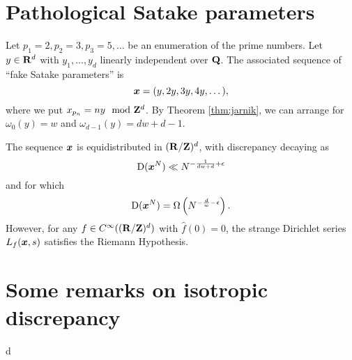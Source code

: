 \section{Pathological Satake parameters}

Let $p_1 = 2, p_2 = 3, p_3 = 5, \dots$ be an enumeration of the prime numbers. 
Let $y\in \mathbf{R}^d$ with $y_1,\dots,y_d$ linearly independent over $\mathbf{Q}$. The 
associated sequence of ``fake Satake parameters'' is 
\[
	{\boldsymbol x} = (y, 2y, 3 y, 4 y, \dots) ,
\]
where we put $x_{p_n} = n y\mod {\mathbf{Z}}^d$. By Theorem \ref{thm:jarnik}, we can 
arrange for $\omega_0(y) = w$ and $\omega_{d-1}(y) = d w + d - 1$. 

\begin{theorem}
The sequence ${\boldsymbol x}$ is equidistributed in $(\mathbf{R}/\mathbf{Z})^d$, with discrepancy 
decaying as 
\[
	\operatorname{D}({\boldsymbol x}^N) \ll N^{-\frac{1}{d w+d} + \epsilon} 
\]
and for which 
\[
	\operatorname{D}({\boldsymbol x}^N) = \Omega\left(N^{-\frac{d}{w} - \epsilon}\right) .
\]
However, for any $f\in C^\infty((\mathbf{R}/\mathbf{Z})^d)$ with $\widehat f(0)=0$, the 
strange Dirichlet series  $L_f({\boldsymbol x},s)$ satisfies the Riemann Hypothesis. 
\end{theorem}





\section{Some remarks on isotropic discrepancy}

d
